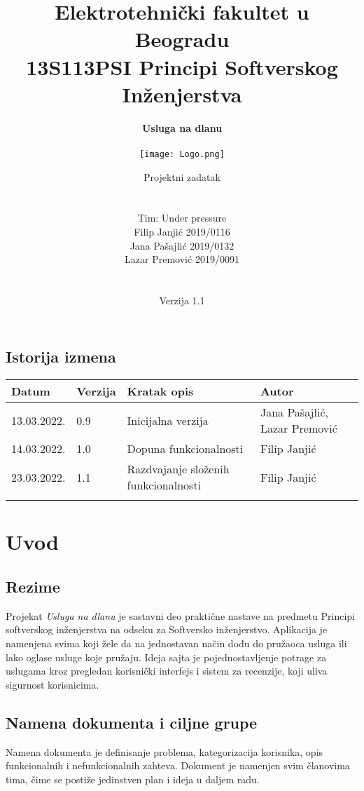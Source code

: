 \documentclass[a4paper,12pt]{report}
\title{\Large Elektrotehnički fakultet u Beogradu \\ 13S113PSI Principi Softverskog Inženjerstva}
\author{\Huge \textbf{Usluga na dlanu}\\ \ \\\texttt{[image: Logo.png]}\\}
\date{\Large Projektni zadatak \\ \ \\ \ \\ \Large   Tim: Under pressure \\ Filip Janjić 2019/0116 \\ Jana Pašajlić 2019/0132 \\ Lazar Premović 2019/0091  \\ \  \\ \  \\\large Verzija 1.1}
\begin{document}
\maketitle

\begin{center}
\section*{Istorija izmena}
\begin{tabular}{ |l|l|l|l|}
\hline
\textbf{Datum} & \textbf{Verzija} & \textbf{Kratak opis} & \textbf{Autor} \\ 
\hline
 13.03.2022. & 0.9  & Inicijalna verzija & Jana Pašajlić, Lazar Premović \\
 \hline
 14.03.2022. & 1.0 & Dopuna funkcionalnosti & Filip Janjić \\
 \hline
 23.03.2022. & 1.1 & Razdvajanje složenih funkcionalnosti & Filip Janjić \\
 \hline
 &  &  &  \\
 \hline
\end{tabular}
\end{center}
\newpage

\tableofcontents

\newpage
\section{Uvod}
\subsection{Rezime}
Projekat \textit{Usluga na dlanu} je sastavni deo praktične nastave na predmetu Principi softverskog inženjerstva na odseku za Softversko inženjerstvo. Aplikacija je namenjena svima koji žele da na jednostavan način dođu do pružaoca usluga ili lako oglase usluge koje pružaju. Ideja sajta je pojednostavljenje potrage za uslugama kroz pregledan korisnički interfejs i sistem za recenzije, koji uliva sigurnost korisnicima.

\subsection{Namena dokumenta i ciljne grupe}
Namena dokumenta je definisanje problema, kategorizacija korisnika, opis funkcionalnih i nefunkcionalnih zahteva. Dokument je namenjen svim članovima tima, čime se postiže jedinstven plan i ideja u daljem radu.
\end{document}
